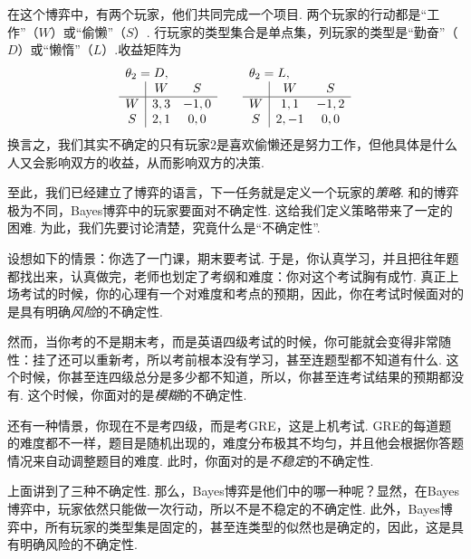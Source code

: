 \begin{example}[“工作还是偷懒”博弈]
    在这个博弈中，有两个玩家，他们共同完成一个项目. 两个玩家的行动都是“工作”（$W$）或“偷懒”（$S$）. 行玩家的类型集合是单点集，列玩家的类型是“勤奋”（$D$）或“懒惰”（$L$）.收益矩阵为
    \[\begin{array}{c|cc}
        \multicolumn{3}{l}{\theta_2=D,}\\
         &W&S  \\\hline
         W&3,3&-1,0\\
         S&2,1&0,0\\
    \end{array}\qquad \begin{array}{c|cc}
        \multicolumn{3}{l}{\theta_2=L,}\\
         &W&S  \\\hline
         W&1,1&-1,2\\
         S&2,-1&0,0\\
    \end{array}\]
    换言之，我们其实不确定的只有玩家$2$是喜欢偷懒还是努力工作，但他具体是什么人又会影响双方的收益，从而影响双方的决策. 
\end{example}

至此，我们已经建立了博弈的语言，下一任务就是定义一个玩家的\textit{策略}. 和的博弈极为不同，Bayes博弈中的玩家要面对不确定性. 这给我们定义策略带来了一定的困难. 为此，我们先要讨论清楚，究竟什么是“不确定性”. 

设想如下的情景：你选了一门课，期末要考试. 于是，你认真学习，并且把往年题都找出来，认真做完，老师也划定了考纲和难度：你对这个考试胸有成竹. 真正上场考试的时候，你的心理有一个对难度和考点的预期，因此，你在考试时候面对的是具有明确\textit{风险}的不确定性. 

然而，当你考的不是期末考，而是英语四级考试的时候，你可能就会变得非常随性：挂了还可以重新考，所以考前根本没有学习，甚至连题型都不知道有什么. 这个时候，你甚至连四级总分是多少都不知道，所以，你甚至连考试结果的预期都没有. 这个时候，你面对的是\textit{模糊}的不确定性. 

还有一种情景，你现在不是考四级，而是考GRE，这是上机考试. GRE的每道题的难度都不一样，题目是随机出现的，难度分布极其不均匀，并且他会根据你答题情况来自动调整题目的难度. 此时，你面对的是\textit{不稳定}的不确定性. 

上面讲到了三种不确定性. 那么，Bayes博弈是他们中的哪一种呢？显然，在Bayes博弈中，玩家依然只能做一次行动，所以不是不稳定的不确定性. 此外，Bayes博弈中，所有玩家的类型集是固定的，甚至连类型的似然也是确定的，因此，这是具有明确风险的不确定性. 

